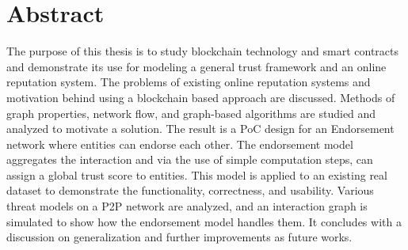\chapter*{Abstract}
The purpose of this thesis is to study blockchain technology and smart
contracts and demonstrate its use for modeling a general trust framework and
an online reputation system. The problems of existing online reputation systems
and motivation behind using a blockchain based approach are discussed. Methods
of graph properties, network flow, and graph-based algorithms are studied and
analyzed to motivate a solution. The result is a PoC design for an Endorsement
network where entities can endorse each other. The endorsement model aggregates
the interaction and via the use of simple computation steps, can assign a
global trust score to entities. This model is applied to an existing real
dataset to demonstrate the functionality, correctness, and usability. Various
threat models on a P2P network are analyzed, and an interaction graph is
simulated to show how the endorsement model handles them. It concludes with a
discussion on generalization and further improvements as future works. 
